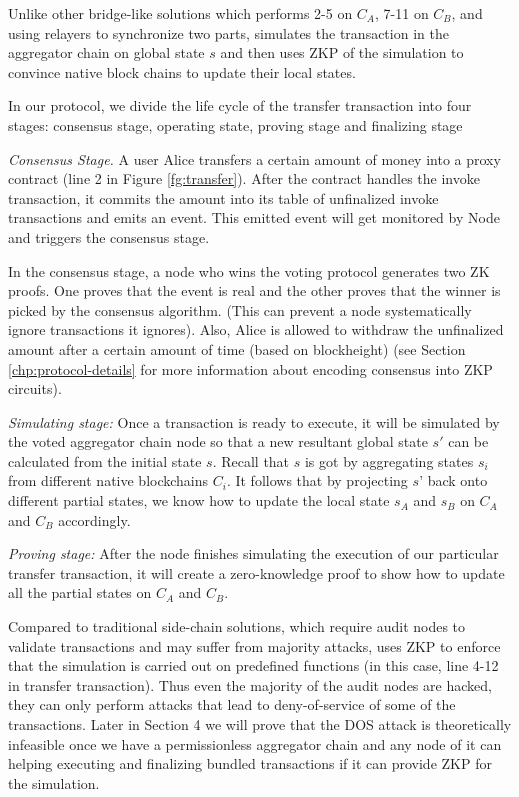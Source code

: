 Unlike other bridge-like solutions which performs 2-5 on $C_A$, 7-11 on $C_B$, and using relayers to synchronize two parts, \dprotocol simulates the transaction in the aggregator chain on global state $s$ and then uses ZKP of the simulation to convince native block chains to update their local states.

In our protocol, we divide the life cycle of the transfer transaction into four stages: consensus stage, operating state, proving stage and finalizing stage



\smallskip\noindent\emph{Consensus Stage.}
A user Alice transfers a certain amount of money into a proxy contract (line 2 in Figure \ref{fg:transfer}). After the contract handles the invoke transaction, it commits the amount into its table of unfinalized invoke transactions and emits an event. This emitted event will get monitored by \dprotocol Node and triggers the consensus stage.

In the consensus stage, a node who wins the voting protocol generates two ZK proofs. One proves that the event is real and the other proves that the winner is picked by the consensus algorithm. (This can prevent a node systematically ignore transactions it ignores). Also, Alice is allowed to withdraw the unfinalized amount after a certain amount of time (based on blockheight) (see Section \ref{chp:protocol-details} for more information about encoding consensus into ZKP circuits).

\smallskip\noindent\emph{Simulating stage:}
Once a transaction is ready to execute, it will be simulated by the voted aggregator chain node so that a new resultant global state $s'$ can be calculated from the initial state $s$. Recall that $s$ is got by aggregating states $s_i$ from different native blockchains $C_i$. It follows that by projecting $s’$ back onto different partial states, we know how to update the local state $s_A$ and $s_B$ on $C_A$ and $C_B$ accordingly.

\smallskip\noindent\emph{Proving stage:}
After the \dprotocol node finishes simulating the execution of our particular transfer transaction, it will create a zero-knowledge proof to show how to update all the partial states on $C_A$  and $C_B$.

Compared to traditional side-chain solutions, which require audit nodes to validate transactions and may suffer from majority attacks, \dprotocol uses ZKP to enforce that the simulation is carried out on predefined functions (in this case, line 4-12 in transfer transaction). Thus even the majority of the audit nodes are hacked, they can only perform attacks that lead to deny-of-service of some of the transactions. Later in Section 4 we will prove that the DOS attack is theoretically infeasible once we have a permissionless aggregator chain and any node of it can helping executing and finalizing bundled transactions if it can provide ZKP for the simulation.

